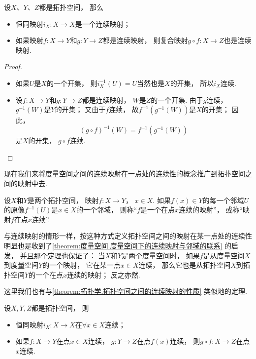 \begin{theorem}\label{theorem:拓扑学.拓扑空间之间的连续映射的性质}
设\(X\)、\(Y\)、\(Z\)都是拓扑空间，
那么\begin{itemize}
	\item 恒同映射\(i_X\colon X \to X\)是一个连续映射；
	\item 如果映射\(f\colon X \to Y\)和\(g\colon Y \to Z\)都是连续映射，
	则复合映射\(g \circ f\colon X \to Z\)也是连续映射.
\end{itemize}
\begin{proof}
\begin{itemize}
	\item 如果\(U\)是\(X\)的一个开集，
	则\(i_X^{-1}(U) = U\)当然也是\(X\)的开集，
	所以\(i_X\)连续.

	\item 设\(f\colon X \to Y\)和\(g\colon Y \to Z\)都是连续映射，
	\(W\)是\(Z\)的一个开集.
	由于\(g\)连续，
	\(g^{-1}(W)\)是\(Y\)的开集；
	又由于\(f\)连续，
	故\(f^{-1}(g^{-1}(W))\)是\(X\)的开集；
	因此，\begin{equation*}
		(g \circ f)^{-1}(W) = f^{-1}(g^{-1}(W))
	\end{equation*}是\(X\)的开集，
	\(g \circ f\)连续.
	\qedhere
\end{itemize}
\end{proof}
\end{theorem}

现在我们来将度量空间之间的连续映射在一点处的连续性的概念推广到拓扑空间之间的映射中去.

\begin{definition}
设\(X\)和\(Y\)是两个拓扑空间，
映射\(f\colon X \to Y\)，
\(x \in X\).
如果\(f(x) \in Y\)的每一个邻域\(U\)的原像\(f^{-1}(U)\)是\(x \in X\)的一个邻域，
则称“\(f\)是一个在点\(x\)连续的映射”，
或称“映射\(f\)在点\(x\)连续”.
\end{definition}
与连续映射的情形一样，按这种方式定义拓扑空间之间的映射在某一点处的连续性
明显也是收到了\cref{theorem:度量空间.度量空间下的连续映射与邻域的联系} 的启发，
并且那个定理也保证了：
当\(X\)和\(Y\)是两个度量空间时，
如果\(f\)是从度量空间\(X\)到度量空间\(Y\)的一个映射，
它在某一点\(x \in X\)连续，
那么它也是从拓扑空间\(X\)到拓扑空间\(Y\)的一个在点\(x\)连续的映射；
反之亦然.

这里我们也有与\cref{theorem:拓扑学.拓扑空间之间的连续映射的性质} 类似地的定理.
\begin{theorem}
设\(X,Y,Z\)都是拓扑空间，
则\begin{itemize}
	\item 恒同映射\(i_X\colon X \to X\)在\(\forall x \in X\)连续；
	\item 如果\(f\colon X \to Y\)在点\(x \in X\)连续，
	\(g\colon Y \to Z\)在点\(f(x)\)连续，
	则\(g \circ f\colon X \to Z\)在点\(x\)连续.
\end{itemize}
\end{theorem}

